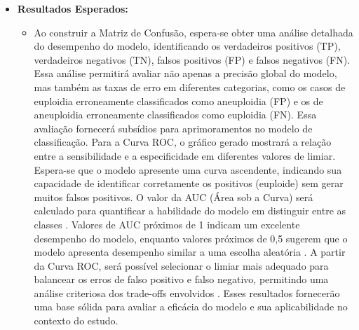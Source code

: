 \begin{itemize}
\begin{itemize}
\begin{itemize}
\begin{itemize}
\begin{itemize}
        \item \textbf{Resultados Esperados:} 
        \begin{itemize}
          \item Ao construir a Matriz de Confusão, espera-se obter uma análise detalhada do desempenho do modelo, identificando os verdadeiros positivos (TP), verdadeiros negativos (TN), falsos positivos (FP) e falsos negativos (FN). Essa análise permitirá avaliar não apenas a precisão global do modelo, mas também as taxas de erro em diferentes categorias, como os casos de euploidia erroneamente classificados como aneuploidia (FP) e os de aneuploidia erroneamente classificados como euploidia (FN). Essa avaliação fornecerá subsídios para aprimoramentos no modelo de classificação. Para a Curva ROC, o gráfico gerado mostrará a relação entre a sensibilidade e a especificidade em diferentes valores de limiar. Espera-se que o modelo apresente uma curva ascendente, indicando sua capacidade de identificar corretamente os positivos (euploide) sem gerar muitos falsos positivos. O valor da AUC (Área sob a Curva) será calculado para quantificar a habilidade do modelo em distinguir entre as classes \cite{vilela2022}. Valores de AUC próximos de 1 indicam um excelente desempenho do modelo, enquanto valores próximos de 0,5 sugerem que o modelo apresenta desempenho similar a uma escolha aleatória \cite{vilela2022}. A partir da Curva ROC, será possível selecionar o limiar mais adequado para balancear os erros de falso positivo e falso negativo, permitindo uma análise criteriosa dos trade-offs envolvidos \cite{vilela2022}. Esses resultados fornecerão uma base sólida para avaliar a eficácia do modelo e sua aplicabilidade no contexto do estudo.
        \end{itemize}
      \end{itemize}


\end{itemize}
\end{itemize}
\end{itemize}
\end{itemize}
